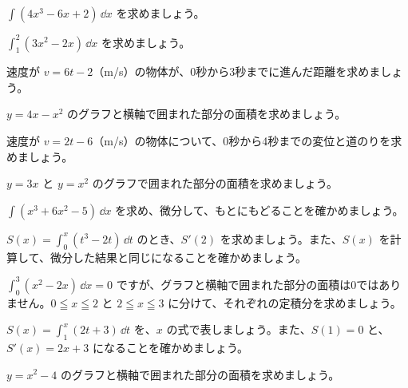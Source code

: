 \bkendproblems
{}

\bkproblem $\displaystyle\int(4x^3-6x+2)\,\dd x$ を求めましょう。

\bkproblem $\displaystyle\int_1^2(3x^2-2x)\,\dd x$ を求めましょう。

\bkproblem 速度が $v=6t-2$（m/s）の物体が、0秒から3秒までに進んだ距離を求めましょう。

\bkproblem $y=4x-x^2$ のグラフと横軸で囲まれた部分の面積を求めましょう。

\bkproblem 速度が $v=2t-6$（m/s）の物体について、0秒から4秒までの変位と道のりを求めましょう。

\bkproblem $y=3x$ と $y=x^2$ のグラフで囲まれた部分の面積を求めましょう。

\bkproblem $\displaystyle\int(x^3+6x^2-5)\,\dd x$ を求め、微分して、もとにもどることを確かめましょう。


\bkproblem $S(x)=\displaystyle\int_0^x(t^3-2t)\,\dd t$ のとき、$S'(2)$ を求めましょう。また、$S(x)$ を計算して、微分した結果と同じになることを確かめましょう。

\bkproblem $\displaystyle\int_0^3(x^2-2x)\,\dd x=0$ ですが、グラフと横軸で囲まれた部分の面積は0ではありません。$0\leqq x\leqq2$ と $2\leqq x\leqq3$ に分けて、それぞれの定積分を求めましょう。

\bkproblem $S(x)=\displaystyle\int_1^x(2t+3)\,\dd t$ を、$x$ の式で表しましょう。また、$S(1)=0$ と、$S'(x)=2x+3$ になることを確かめましょう。

\bkproblem $y=x^2-4$ のグラフと横軸で囲まれた部分の面積を求めましょう。

